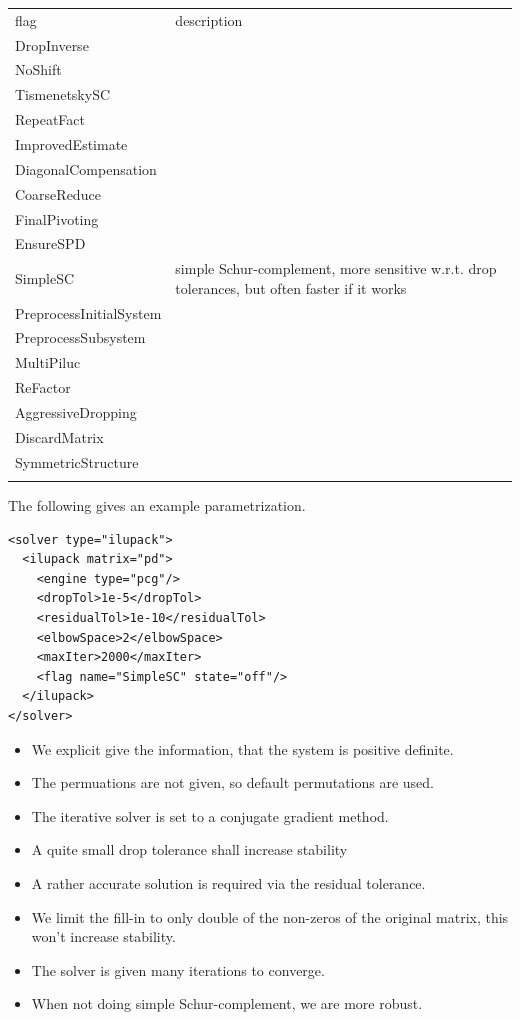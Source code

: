 \begin{center}
\begin{tabular}{lp{}}
\hline\noalign{\smallskip}
flag & description \\
\noalign{\smallskip}\hline\noalign{\smallskip}
DropInverse & \\
NoShift & \\
TismenetskySC & \\
RepeatFact & \\
ImprovedEstimate & \\
DiagonalCompensation & \\
CoarseReduce & \\
FinalPivoting & \\
EnsureSPD & \\
SimpleSC & simple Schur-complement, more sensitive w.r.t. drop tolerances, but often faster if it works\\
PreprocessInitialSystem & \\
PreprocessSubsystem & \\
MultiPiluc & \\
ReFactor & \\
AggressiveDropping & \\
DiscardMatrix & \\
SymmetricStructure & \\
\noalign{\smallskip}\hline
\end{tabular}
\end{center}

The following gives an example parametrization. 
\begin{verbatim}
<solver type="ilupack">
  <ilupack matrix="pd">
    <engine type="pcg"/>
    <dropTol>1e-5</dropTol>
    <residualTol>1e-10</residualTol>
    <elbowSpace>2</elbowSpace>
    <maxIter>2000</maxIter>
    <flag name="SimpleSC" state="off"/>
  </ilupack> 
</solver>
\end{verbatim}
\begin{itemize}
\item We explicit give the information, that the system is positive definite.
\item The permuations are not given, so default permutations are used. 
\item The iterative solver is set to a conjugate gradient method.
\item A quite small drop tolerance shall increase stability
\item A rather accurate solution is required via the residual tolerance.
\item We limit the fill-in to only double of the non-zeros of the original matrix, this won't increase stability.
\item The solver is given many iterations to converge.
\item When not doing simple Schur-complement, we are more robust.
\end{itemize}


